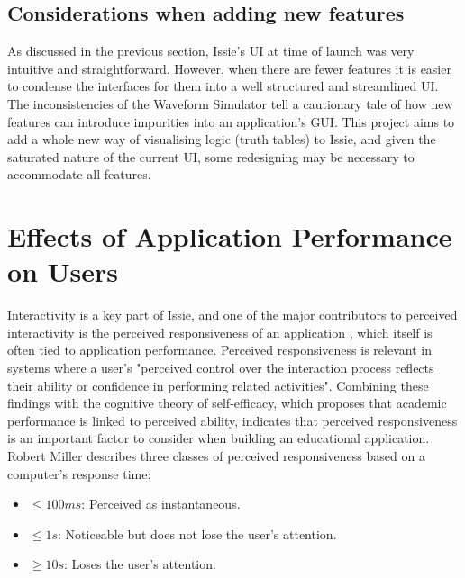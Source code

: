 \subsection{Considerations when adding new features}
As discussed in the previous section, Issie's UI at time of launch was very intuitive and straightforward. However, when there are fewer features it is easier to condense the interfaces for them into a well structured and streamlined UI. The inconsistencies of the Waveform Simulator tell a cautionary tale of how new features can introduce impurities into an application's GUI. This project aims to add a whole new way of visualising logic (truth tables) to Issie, and given the saturated nature of the current UI, some redesigning may be necessary to accommodate all features.

\section{Effects of Application Performance on Users} \label{sec:perfeffects}
Interactivity is a key part of Issie, and one of the major contributors to perceived interactivity is the perceived responsiveness of an application \cite{interactiveWu}, which itself is often tied to application performance. Perceived responsiveness is relevant in systems where a user's "perceived control over the interaction process reflects their ability or confidence in performing related activities". Combining these findings with the cognitive theory of self-efficacy, which proposes that academic performance is linked to perceived ability, indicates that perceived responsiveness is an important factor to consider when building an educational application. Robert Miller \cite{Miller1968ResponseTI} describes three classes of perceived responsiveness based on a computer's response time:
\begin{itemize}
    \item $\leq 100ms$: Perceived as instantaneous.
    \item $\leq 1s$: Noticeable but does not lose the user's attention.
    \item $\geq 10s$: Loses the user's attention.
\end{itemize}

